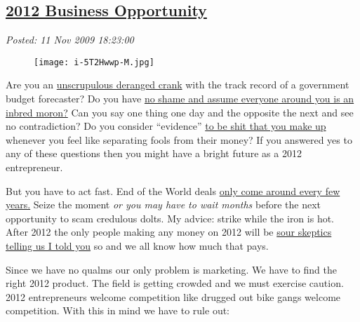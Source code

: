 %

\subsection*{\href{https://bakerjd99.wordpress.com/2009/11/11/2012-business-opportunity/}{2012 Business Opportunity}}


\noindent\emph{Posted: 11 Nov 2009 18:23:00}
\vspace{6pt}



\begin{figure}[htbp]
\centering
\texttt{[image: i-5T2Hwwp-M.jpg]}
\label{fig:295X0}
\end{figure}


Are
you an
\href{http://en.wikipedia.org/wiki/Richard\_C.\_Hoagland}{unscrupulous
deranged crank} with the track record of a government budget forecaster?
Do you have \href{http://www.bennyhinn.org/default.cfm}{no shame and
assume everyone around you is an inbred moron?} Can you say one thing
one day and the opposite the next and see no contradiction? Do you
consider ``evidence''
\href{http://blogcritics.org/scitech/article/is-science-just-another-opinion/}{to
be shit that you make up} whenever you feel like separating fools from
their money? If you answered yes to any of these questions then you
might have a bright future as a 2012 entrepreneur.

But you have to act fast. End of the World deals
\href{http://www.bible.ca/pre-date-setters.htm}{only come around every
few years.} Seize the moment \emph{or you may have to wait months}
before the next opportunity to scam credulous dolts. My advice: strike
while the iron is hot. After 2012 the only people making any money on
2012 will be
\href{http://www.skyandtelescope.com/news/64430612.html}{sour skeptics
telling us I told you} so and we all know how much that pays.

Since we have no qualms our only problem is marketing. We have to find
the right 2012 product. The field is getting crowded and we must
exercise caution. 2012 entrepreneurs welcome competition like drugged
out bike gangs welcome competition. With this in mind we have to rule
out:

